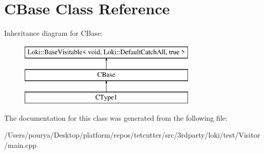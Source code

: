 \hypertarget{classCBase}{}\section{C\+Base Class Reference}
\label{classCBase}
Inheritance diagram for C\+Base\+:\begin{figure}[H]
\begin{center}
\leavevmode
\includegraphics[height=3.000000cm]{classCBase}
\end{center}
\end{figure}


The documentation for this class was generated from the following file\+:\begin{DoxyCompactItemize}
\item 
/\+Users/pourya/\+Desktop/platform/repos/tetcutter/src/3rdparty/loki/test/\+Visitor/main.\+cpp\end{DoxyCompactItemize}
